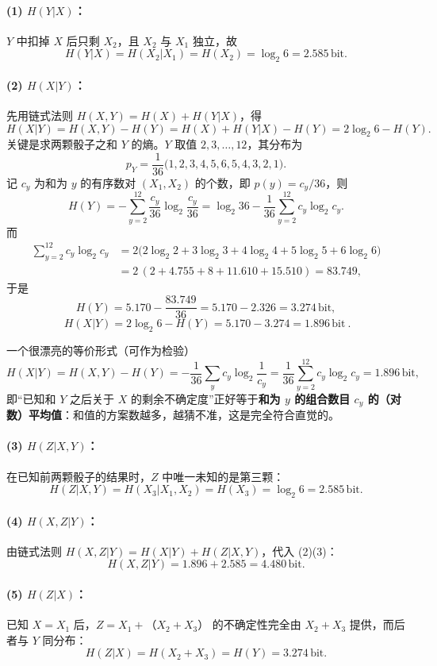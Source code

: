 \documentclass[11pt,a4paper]{ctexart}
\newcommand{\Hx}[1]{H\!\left(#1\right)}
\newcommand{\lb}{\log_{2}}
\newcommand{\bit}{\,\text{bit}}
\begin{document}
\paragraph{(1) $\Hx{Y|X}$：}
$Y$ 中扣掉 $X$ 后只剩 $X_2$，且 $X_2$ 与 $X_1$ 独立，故
\[
\Hx{Y|X}=\Hx{X_2 | X_1}=\Hx{X_2}=\lb 6=2.585\bit .
\]

\paragraph{(2) $\Hx{X|Y}$：}
先用链式法则 $\Hx{X,Y}=\Hx{X}+\Hx{Y|X}$，得
\[
\Hx{X|Y}=\Hx{X,Y}-\Hx{Y}=\Hx{X}+\Hx{Y|X}-\Hx{Y}=2\lb 6-\Hx{Y}.
\]
关键是求两颗骰子之和 $Y$ 的熵。$Y$ 取值 $2,3,\dots,12$，其分布为
\[
p_Y=\frac{1}{36}\bigl(1,2,3,4,5,6,5,4,3,2,1\bigr).
\]
记 $c_y$ 为和为 $y$ 的有序数对 $(X_1,X_2)$ 的个数，即 $p(y)=c_y/36$，则
\[
\Hx{Y}=-\sum_{y=2}^{12}\frac{c_y}{36}\lb\frac{c_y}{36}
=\lb 36-\frac{1}{36}\sum_{y=2}^{12}c_y\lb c_y .
\]
而
\[
\begin{aligned}
\sum_{y=2}^{12}c_y\lb c_y
&=2\bigl(2\lb 2+3\lb 3+4\lb 4+5\lb 5+6\lb 6\bigr)\\
&=2\,(2+4.755+8+11.610+15.510)=83.749,
\end{aligned}
\]
于是
\[
\Hx{Y}=5.170-\frac{83.749}{36}=5.170-2.326=3.274\bit,
\]
\[
\boxed{\ \Hx{X|Y}=2\lb 6-\Hx{Y}=5.170-3.274=1.896\bit\ }.
\]

\begin{keypoint}{一个很漂亮的等价形式（可作为检验）}
\[
\Hx{X|Y}=\Hx{X,Y}-\Hx{Y}
=-\frac{1}{36}\sum_{y}c_y\lb\frac{1}{c_y}
=\frac{1}{36}\sum_{y=2}^{12}c_y\lb c_y=1.896\bit,
\]
即“已知和 $Y$ 之后关于 $X$ 的剩余不确定度”正好等于\textbf{和为 $y$ 的组合数目 $c_y$ 的（对数）平均值}：和值的方案数越多，越猜不准，这是完全符合直觉的。
\end{keypoint}

\paragraph{(3) $\Hx{Z|X,Y}$：}
在已知前两颗骰子的结果时，$Z$ 中唯一未知的是第三颗：
\[
\Hx{Z|X,Y}=\Hx{X_3|X_1,X_2}=\Hx{X_3}=\lb 6=2.585\bit .
\]

\paragraph{(4) $\Hx{X,Z|Y}$：}
由链式法则 $\Hx{X,Z|Y}=\Hx{X|Y}+\Hx{Z|X,Y}$，代入 (2)(3)：
\[
\Hx{X,Z|Y}=1.896+2.585=4.480\bit .
\]

\paragraph{(5) $\Hx{Z|X}$：}
已知 $X=X_1$ 后，$Z=X_1+（X_2+X_3）$ 的不确定性完全由 $X_2+X_3$ 提供，而后者与 $Y$ 同分布：
\[
\Hx{Z|X}=\Hx{X_2+X_3}=\Hx{Y}=3.274\bit .
\]
\end{document}
